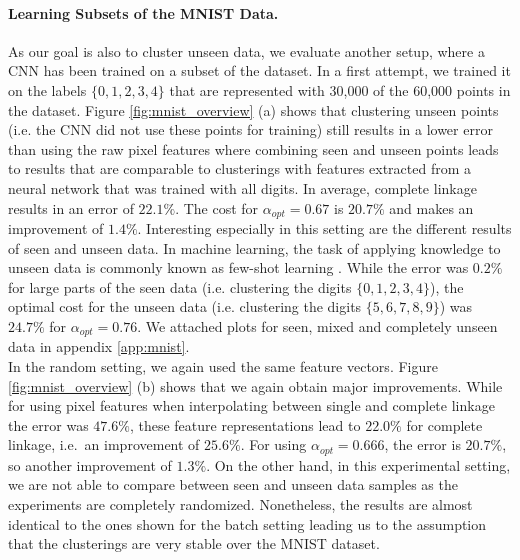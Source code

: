 \paragraph{Learning Subsets of the MNIST Data.} As our goal is also to cluster unseen data, we evaluate another setup, where a CNN has been trained on a subset of the dataset. In a first attempt, we trained it on the labels $\{0,1,2,3,4\}$ that are represented with 30,000 of the 60,000 points in the dataset. Figure \ref{fig:mnist_overview} (a) shows that clustering unseen points (i.e. the CNN did not use these points for training) still results in a lower error than using the raw pixel features where combining seen and unseen points leads to results that are comparable to clusterings with features extracted from a neural network that was trained with all digits. In average, complete linkage results in an error of $22.1\%$. The cost for $\alpha_{opt} = 0.67$ is $20.7\%$ and makes an improvement of $1.4\%$. Interesting especially in this setting are the different results of seen and unseen data. In machine learning, the task of applying knowledge to unseen data is commonly known as few-shot learning \cite{ren2018meta}. While the error was $0.2\%$ for large parts of the seen data (i.e. clustering the digits $\{0,1,2,3,4\}$), the optimal cost for the unseen data (i.e. clustering the digits $\{5,6,7,8,9\}$) was $24.7\%$ for $\alpha_{opt} = 0.76$. We attached plots for seen, mixed and completely unseen data in appendix \ref{app:mnist}.\\

In the random setting, we again used the same feature vectors. Figure \ref{fig:mnist_overview} (b) shows that we again obtain major improvements. While for using pixel features when interpolating between single and complete linkage the error was $47.6\%$, these feature representations lead to $22.0\%$ for complete linkage, i.e.\ an improvement of $25.6\%$. For using $\alpha_{opt} = 0.666$, the error is $20.7\%$, so another improvement of $1.3\%$. On the other hand, in this experimental setting, we are not able to compare between seen and unseen data samples as the experiments are completely randomized. Nonetheless, the results are almost identical to the ones shown for the batch setting leading us to the assumption that the clusterings are very stable over the MNIST dataset.

